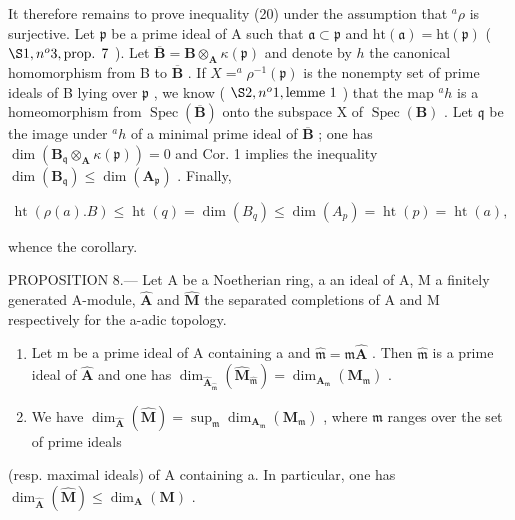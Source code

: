 It therefore remains to prove inequality (20) under the assumption that \(^a\rho\) is surjective. Let \(\mathfrak{p}\) be a prime ideal of A such that \(\mathfrak{a} \subset \mathfrak{p}\) and \(\mathrm{ht}(\mathfrak{a}) = \mathrm{ht}(\mathfrak{p})\) ( \(\S 1, n^o 3, \text{prop. } 7\) ). Let \(\overline{\mathbf{B}} = \mathbf{B} \otimes_{\mathbf{A}} \kappa(\mathfrak{p})\) and denote by \(h\) the canonical homomorphism from B to \(\overline{\mathbf{B}}\) . If \(X = ^a\rho^{-1}(\mathfrak{p})\) is the nonempty set of prime ideals of B lying over \(\mathfrak{p}\) , we know ( \(\S 2, n^o 1, \text{lemme 1}\) ) that the map \(^ah\) is a homeomorphism from \(\operatorname{Spec}(\overline{\mathbf{B}})\) onto the subspace X of \(\operatorname{Spec}(\mathbf{B})\) . Let \(\mathfrak{q}\) be the image under \(^ah\) of a minimal prime ideal of \(\overline{\mathbf{B}}\) ; one has \(\dim(\mathbf{B}_{\mathfrak{q}} \otimes_{\mathbf{A}} \kappa(\mathfrak{p})) = 0\) and Cor. 1 implies the inequality \(\dim(\mathbf{B}_{\mathfrak{q}}) \leqslant \dim(\mathbf{A}_{\mathfrak{p}})\) . Finally,

\[
\operatorname{ht} (\rho (a). B) \leqslant \operatorname{ht} (q) = \dim (B _ {q}) \leqslant \dim (A _ {p}) = \operatorname{ht} (p) = \operatorname{ht} (a),
\]

whence the corollary.

PROPOSITION 8.--- Let A be a Noetherian ring, a an ideal of A, M a finitely generated A-module, \(\hat{\mathbf{A}}\) and \(\hat{\mathbf{M}}\) the separated completions of A and M respectively for the a-adic topology.

\begin{enumerate}
\def\labelenumi{\alph{enumi})}
\item
  Let m be a prime ideal of A containing a and \(\hat{\mathfrak{m}} = \mathfrak{m}\hat{\mathbf{A}}\) . Then \(\hat{\mathfrak{m}}\) is a prime ideal of \(\hat{\mathbf{A}}\) and one has \(\dim_{\hat{\mathbf{A}}_{\hat{\mathfrak{m}}}}(\hat{\mathbf{M}}_{\hat{\mathfrak{m}}}) = \dim_{\mathbf{A}_{\mathfrak{m}}}(\mathbf{M}_{\mathfrak{m}})\) .
\item
  We have \(\dim_{\hat{\mathbf{A}}}(\hat{\mathbf{M}}) = \sup_{\mathfrak{m}} \dim_{\mathbf{A}_{\mathfrak{m}}}(\mathbf{M}_{\mathfrak{m}})\) , where \(\mathfrak{m}\) ranges over the set of prime ideals
\end{enumerate}

(resp. maximal ideals) of A containing a. In particular, one has \(\dim_{\hat{\mathbf{A}}}(\hat{\mathbf{M}}) \leqslant \dim_{\mathbf{A}}(\mathbf{M})\) .


